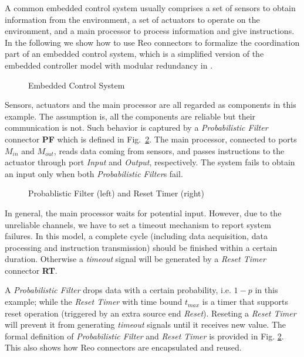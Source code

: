 \begin{example}
A common embedded control system usually comprises a set of sensors to obtain information from the environment, a set of actuators to operate on the environment, and a main processor to process information and give instructions. In the following we show how to use Reo connectors to formalize the coordination part of an embedded control system, which is a simplified version of the embedded controller model with modular redundancy in \cite{Kwia2007}.

\begin{figure}[H]
    \centering
    \resizebox{.8\textwidth}{!}{
        
    }
    \caption{Embedded Control System}
    \label{fig:em}
\end{figure}

Sensors, actuators and the main processor are all regarded as components in this example.
The assumption is, all the components are reliable but their communication is not. Such behavior is captured by a \emph{Probabilistic Filter} connector \textbf{PF} which is defined in Fig.~\ref{fig:em2}.
The main processor, connected to ports \emph{$M_{in}$} and \emph{$M_{out}$},
reads data coming from sensors, and passes instructions to the actuator
through port \emph{Input} and \emph{Output}, respectively.
The system fails to obtain an input only when both \emph{Probabilistic Filter}s fail.

\begin{figure}[H]
    \centering
    \resizebox{.8\textwidth}{!}{
        
    }
    \caption{Probablistic Filter (left) and Reset Timer (right)}
    \label{fig:em2}
\end{figure}

In general, the main processor waits for potential input. However, due to the unreliable channels, we have to set a timeout mechanism to report system failures. In this model, a complete cycle (including data acquisition, data processing and instruction transmission) should be finished within a certain duration. Otherwise a \emph{timeout} signal will be generated by a \emph{Reset Timer} connector \textbf{RT}.

A \emph{Probabilistic Filter} drops data with a certain probability, i.e. $1 - p$ in this example; while
the \emph{Reset Timer} with time bound $t_{max}$ is a timer that supports reset operation (triggered by an extra source end \emph{Reset}). Reseting a \emph{Reset Timer} will prevent it from generating \emph{timeout} signals until it receives new value. The formal definition of \emph{Probabilistic Filter} and \emph{Reset Timer} is provided in Fig. \ref{fig:em2}. This also shows how Reo connectors are encapsulated and reused.


\end{example}
